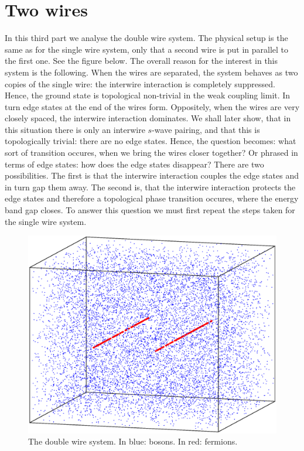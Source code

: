 \documentclass[11pt, twoside]{Thesis}
\begin{document}
\part{Two wires}
In this third part we analyse the double wire system. The physical setup is the same as for the single wire system, only that a second wire is put in parallel to the first one. See the figure below. The overall reason for the interest in this system is the following. When the wires are separated, the system behaves as two copies of the single wire: the interwire interaction is completely suppressed. Hence, the ground state is topological non-trivial in the weak coupling limit. In turn edge states at the end of the wires form. Oppositely, when the wires are very closely spaced, the interwire interaction dominates. We shall later show, that in this situation there is only an interwire $s$-wave pairing, and that this is topologically trivial: there are no edge states. Hence, the question becomes: what sort of transition occures, when we bring the wires closer together? Or phrased in terms of edge states: how does the edge states disappear? There are two possibilities. The first is that the interwire interaction couples the edge states and in turn gap them away. The second is, that the interwire interaction protects the edge states and therefore a topological phase transition occures, where the energy band gap closes. To answer this question we must first repeat the steps taken for the single wire system. 
\begin{figure}[H]
\center
\includegraphics[width=0.8\columnwidth]{gasandwires3.eps}
\\ The double wire system. In blue: bosons. In red: fermions.   
\end{figure}
\newpage
\end{document}
